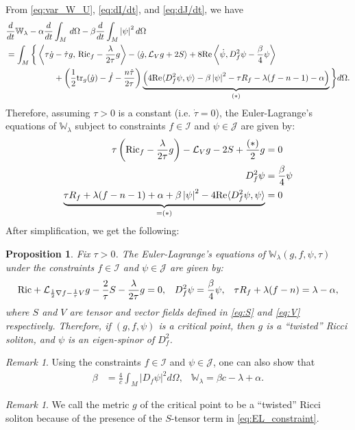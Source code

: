 \documentclass{amsart}
\newtheorem{proposition}[theorem]{Proposition}
\theoremstyle{definition}
\theoremstyle{remark}
\newtheorem{remark}[theorem]{Remark}
\numberwithin{equation}{section}
\newcommand{\abs}[1]{\left|#1\right|}
\newcommand{\tr}{\textup{tr}}
\newcommand{\Ric}{\textup{Ric}}
\begin{document}
From \eqref{eq:var_W_U}, \eqref{eq:dI/dt}, and \eqref{eq:dJ/dt}, we have
\begin{align*}
& \frac{d}{dt}\mathbb{W}_\lambda - \alpha\frac{d}{dt}\int_M\,d\Omega - \beta \frac{d}{dt}\int_M \abs{\psi}^2 d\Omega\\
& = \int_M \bigg\{ \left\langle \tau\dot{g} - \dot{\tau}g,\, \Ric_f - \frac{\lambda}{2\tau}g  \right\rangle - \left\langle \dot{g}, \mathcal{L}_{V} g + 2S\right\rangle + 8\textup{Re} \left\langle \dot\psi, D_f^2\psi - \frac{\beta}{4}\psi\right\rangle \nonumber\\
&\hskip 2cm + \left(\frac{1}{2}\tr_g(\dot{g}) - \dot{f} -  \frac{n\dot\tau}{2\tau}\right)\underbrace{\left(4\textup{Re}\langle D_f^2\psi, \psi\rangle - \beta \abs{\psi}^2 -\tau R_f - \lambda(f-n-1) - \alpha\right)}_{(*)}\bigg\} d\Omega. \nonumber	
\end{align*}
Therefore, assuming $\tau > 0$ is a constant (i.e. $\dot\tau = 0$), the Euler-Lagrange's equations of $\mathbb{W}_\lambda$ subject to constraints $f \in \mathcal{I}$ and $\psi \in \mathcal{J}$ are given by:
\begin{align*}
\tau\left(\Ric_f - \frac{\lambda}{2\tau}g\right) - \mathcal{L}_{V}g - 2S + \frac{(*)}{2}g& = 0\\
D_f^2\psi & = \frac{\beta}{4}\psi\\
\underbrace{\tau R_f + \lambda(f-n-1) + \alpha + \beta\abs{\psi}^2 - 4\textup{Re}\langle D_f^2\psi, \psi\rangle}_{=(*)} & = 0	
\end{align*}
After simplification, we get the following:

\begin{proposition}
\label{prop:EL_constraint}
Fix $\tau > 0$. The Euler-Lagrange's equations of $\mathbb{W}_\lambda(g,f,\psi,\tau)$ under the constraints $f \in \mathcal{I}$ and $\psi \in \mathcal{J}$ are given by:	
\begin{align}
\label{eq:EL_constraint}
\Ric + \mathcal{L}_{\frac{1}{2}\nabla f-\frac{1}{\tau}V}g -\frac{2}{\tau}S - \frac{\lambda}{2\tau}g  & = 0, & D_f^2\psi & = \frac{\beta}{4}\psi, & \tau R_f + \lambda(f-n) = \lambda - \alpha,
\end{align}
where $S$ and $V$ are tensor and vector fields defined in \eqref{eq:S} and \eqref{eq:V} respectively. Therefore, if $(g,f,\psi)$ is a critical point, then $g$ is a ``twisted'' Ricci soliton, and $\psi$ is an eigen-spinor of $D_f^2$.
\end{proposition}
\begin{remark}
Using the constraints $f \in \mathcal{I}$ and $\psi \in \mathcal{J}$, one can also show that
\begin{align*}
\beta & = \frac{4}{c}\int_M \abs{D_f\psi}^2 d\Omega, & \mathbb{W}_\lambda = \beta c - \lambda + \alpha.
\end{align*}
\end{remark}
\begin{remark}
We call the metric $g$ of the critical point to be a ``twisted'' Ricci soliton because of the presence of the $S$-tensor term in \eqref{eq:EL_constraint}.
\end{remark}
\end{document}
